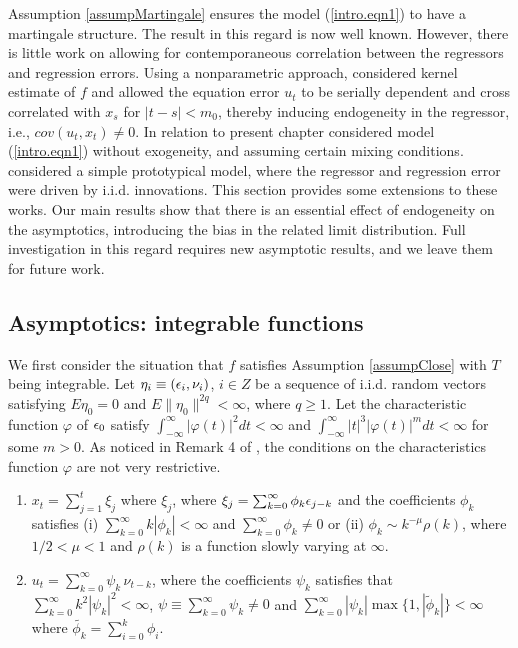 Assumption \ref{assumpMartingale} ensures the model (\ref {intro.eqn1}) to have a martingale structure.
The result in this regard is now well known. However, there is little work
on allowing for contemporaneous correlation between the regressors and regression errors.
Using a nonparametric approach, \cite{wangphillips2009} considered kernel estimate of $f$ and allowed the equation error $u_t$ to be serially dependent and cross correlated with $x_s$ for $|t-s|<m_0$, thereby inducing endogeneity in the regressor, i.e., $cov (u_t, x_t)\not=0$. In relation to present chapter \cite{dejong2002} considered model (\ref{intro.eqn1}) without exogeneity, and assuming certain mixing conditions. \cite{changpark2010} considered a simple prototypical model, where the regressor and regression error were driven by i.i.d. innovations. This section  provides some  extensions to these works. Our main results  show that there is an essential effect of endogeneity on the asymptotics,  introducing the bias in the related limit distribution. Full investigation in this regard requires new asymptotic results, and we leave them for future work.


\subsection{Asymptotics: integrable functions} 

We first consider the situation that $f$ satisfies Assumption \ref{assumpClose} with $T$
being integrable.  Let $\eta_i\equiv (\epsilon_i, \nu_i)$, $i\in Z$ be a sequence of i.i.d. random vectors satisfying $E\eta_0=0$ and $E\|\eta_0\|^{2q}<\infty$,
 where $q \ge 1$. Let the characteristic function $\varphi$ of $\epsilon_0$ satisfy $\int_{-\infty}^{\infty} | \varphi(t)|^2 dt < \infty$ and $\int_{-\infty}^{\infty} |t|^3 |\varphi(t)|^m dt < \infty$ for some $m > 0$. As noticed in Remark 4 of \cite{jaganathan2008}, the conditions on the characteristics function $\varphi$ are not very restrictive.



\begin{assump}
\begin{enumerate}[label=(\roman{*}), leftmargin=*, widest=0] \itemsep0pt \parskip0pt 
\item $x_t=\sum_{j=1}^t\xi_j$ where $\xi_j$, where $\xi_j=\sum_{k=0}^{\infty}\phi_k\epsilon_{j-k}$ and the coefficients $\phi_k$ satisfies (i) $\sum_{k = 0}^{\infty} k |\phi_k|< \infty$ and $\sum_{k = 0}^{\infty} \phi_k \ne 0$ or (ii) $\phi_k \sim k^{-\mu} \rho(k)$, where $1/2 < \mu < 1$ and $\rho(k)$ is a function slowly varying at $\infty$.
\item $u_t= \sum_{k=0}^{\infty}\psi_k\, \nu_{t-k}$, where the coefficients $\psi_k$ satisfies that  $\sum_{k=0}^{\infty}k^2 |\psi_k|^2<\infty$, $ \psi \equiv \sum_{k=0}^{\infty}\psi_k\not= 0$ and $\sum_{k=0}^{\infty} |\psi_k| \max\{1, |\tilde{\phi}_k|\}< \infty$ where $\tilde{\phi_k} = \sum_{i = 0}^k \phi_i$.
\end{enumerate}
\end{assump}


